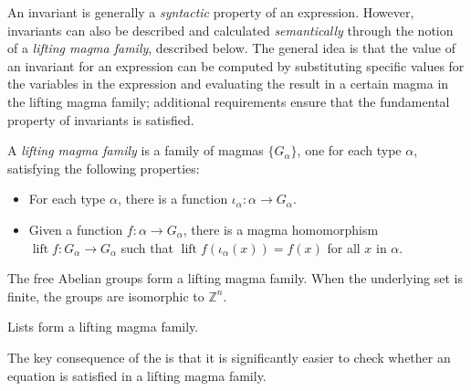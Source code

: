 An invariant is generally a \emph{syntactic} property of an expression. However, invariants can also be described and calculated \emph{semantically} through the notion of a \emph{lifting magma family}, described below. The general idea is that the value of an invariant for an expression can be computed by substituting specific values for the variables in the expression and evaluating the result in a certain magma in the lifting magma family; additional requirements ensure that the fundamental property of invariants is satisfied.

\begin{definition}\leanok\label{lifting-magma-family}
	A \emph{lifting magma family} is a family of magmas $\{G_\alpha\}$, one for each type $\alpha$, satisfying the following properties:
	\begin{itemize}
		\item For each type $\alpha$, there is a function $\iota_\alpha : \alpha \to G_\alpha$.
		\item Given a function $f : \alpha \to G_\alpha$, there is a magma homomorphism $\operatorname{lift}{f} : G_\alpha \to G_\alpha$ such that $\operatorname{lift}{f}(\iota_\alpha(x)) = f(x)$ for all $x$ in $\alpha$.
	\end{itemize}
\end{definition}

\begin{example}
	The free Abelian groups form a lifting magma family. When the underlying set is finite, the groups are isomorphic to $\mathbb{Z}^n$.
\end{example}

\begin{example}
	Lists form a lifting magma family.
\end{example}

The key consequence of the  is that it is significantly easier to check whether an equation is satisfied in a lifting magma family.

